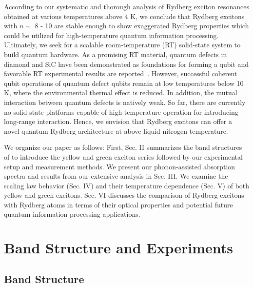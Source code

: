 \documentclass[aps,reprint,amsmath,amssymb,prb]{revtex4-1}
\begin{document}
According to our systematic and thorough analysis of Rydberg exciton resonances obtained at various temperatures above 4 K, we conclude that Rydberg excitons with $n \sim$ 8 - 10 are stable enough to show exaggerated Rydberg properties which could be utilized for high-temperature quantum information processing. Ultimately, we seek for a scalable room-temperature (RT) solid-state system to build quantum hardware. As a promising RT material, quantum defects in diamond and SiC have been demonstrated as foundations for forming a qubit and favorable RT experimental results are reported~\cite{Wrachtrup2010,Weber2010,Bassett2019}. However, successful coherent qubit operations of quantum defect qubits remain at low temperatures below 10 K, where the environmental thermal effect is reduced. In addition, the mutual interaction between quantum defects is natively weak. So far, there are currently no solid-state platforms capable of high-temperature operation for introducing long-range interaction. Hence, we envision that  Rydberg excitons can offer a novel quantum Rydberg architecture at above liquid-nitrogen temperature.   

We organize our paper as follows: First, Sec. II summarizes the band structures of  to introduce the yellow and green exciton series followed by our experimental setup and measurement methods. We present our phonon-assisted absorption spectra and results from our extensive analysis in Sec. III. We examine the scaling law behavior (Sec. IV) and their temperature dependence (Sec. V) of both yellow and green excitons. Sec. VI discusses the comparison of Rydberg excitons with Rydberg atoms in terms of their optical properties and potential future quantum information processing applications. 

\section{Band Structure and Experiments}

\subsection{Band Structure}
\end{document}
